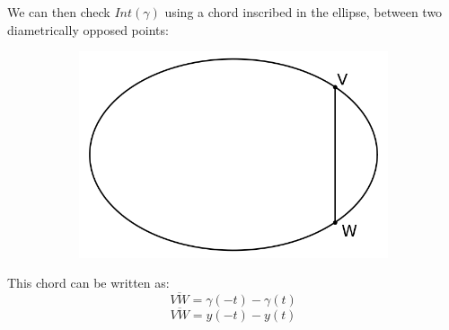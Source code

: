 \documentclass[12pt]{article}
\begin{document}
\clearpage
We can then check $Int(\gamma)$ using a chord inscribed in the ellipse, between two diametrically opposed points:\\
\begin{figure}[h!]
  \centering
      \begin{subfigure}[b]{0.5\linewidth}
    \includegraphics[width=\linewidth]{./assets/3-3-1/ellipse-vertical-chord.png}
  \end{subfigure}
  \end{figure}

This chord can be written as:
$$
\overline{VW} = \gamma(-t) - \gamma(t)
$$
$$
\overline{VW} = y(-t) - y(t)
$$
\end{document}
